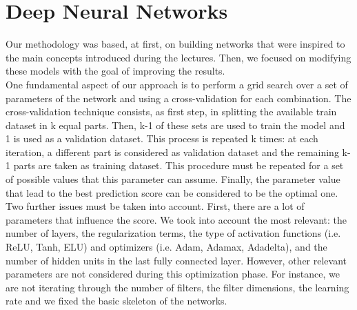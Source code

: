 \documentclass[10pt,conference,compsocconf]{IEEEtran}
\begin{document}
\section{Deep Neural Networks}
\label{sec:deep}
Our methodology was based, at first, on building networks that were inspired to the main concepts introduced during the lectures. Then, we focused on modifying these models with the goal of improving the results.\\
One fundamental aspect of our approach is to perform a grid search over a set of parameters of the network and using a cross-validation for each combination.
The cross-validation technique consists, as first step, in splitting the available train dataset in k equal parts. Then, k-1 of these sets are used to train the model and 1 is used as a validation dataset. This process is repeated k times: at each iteration, a different part is considered as validation dataset and the remaining k-1 parts are taken as training dataset. This procedure must be repeated for a set of possible values that this parameter can assume. Finally, the parameter value that lead to the best prediction score can be considered to be the optimal one.\\
Two further issues must be taken into account. First, there are a lot of parameters that influence the score. We took into account the most relevant: the number of layers, the regularization terms, the type of activation functions (i.e. ReLU, Tanh, ELU) and optimizers (i.e. Adam, Adamax, Adadelta), and the number of hidden units in the last fully connected layer. However, other relevant parameters are not considered during this optimization phase. For instance, we are not iterating through the number of filters, the filter dimensions, the learning rate and we fixed the basic skeleton of the networks.\\
\end{document}
